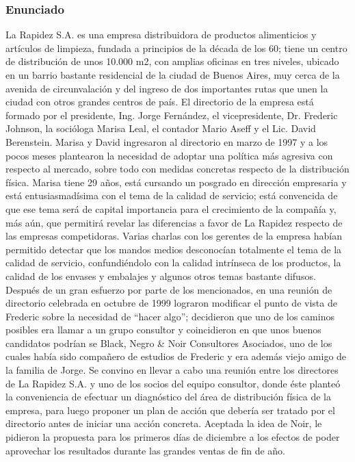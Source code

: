 \documentclass[a4paper,10pt]{article}
\begin{document}
	\subsubsection{Enunciado}
	La Rapidez S.A. es una empresa distribuidora de productos alimenticios y artículos de limpieza, fundada a principios de la década de los 60; tiene un centro de distribución de unos 10.000 m2, con amplias oficinas en tres niveles, ubicado en un barrio bastante residencial de la ciudad de Buenos Aires, muy cerca de la avenida de circunvalación y del ingreso de dos importantes rutas que unen la ciudad con otros grandes centros de país. El directorio de la empresa está formado por el presidente, Ing. Jorge Fernández, el vicepresidente, Dr. Frederic Johnson, la socióloga Marisa Leal, el contador Mario Aseff y el Lic. David Berenstein. Marisa y David ingresaron al directorio en marzo de 1997 y a los pocos meses plantearon la necesidad de adoptar una política más agresiva con respecto al mercado, sobre todo con medidas concretas respecto de la distribución física. Marisa tiene 29 años, está cursando un posgrado en dirección empresaria y está entusiasmadísima con el  tema de la calidad de servicio; está convencida de que ese tema será de capital importancia para el crecimiento de la compañía y, más aún, que permitirá revelar las diferencias a favor de La Rapidez respecto de las empresas competidoras. Varias charlas con los gerentes de la empresa habían permitido detectar que los mandos medios desconocían totalmente el tema de la calidad de servicio, confundiéndolo con la calidad intrínseca de los productos, la calidad de los envases y embalajes y algunos otros temas bastante difusos.\\Después de un gran esfuerzo por parte de los mencionados, en una reunión de directorio celebrada en octubre de 1999 lograron modificar el punto de vista de Frederic sobre la necesidad de “hacer algo”; decidieron que uno de los caminos posibles era llamar a un grupo consultor y coincidieron en que unos buenos candidatos podrían se Black, Negro \& Noir Consultores Asociados, uno de los cuales había sido compañero de estudios de Frederic y era además viejo amigo de la familia de Jorge. Se convino en llevar a cabo una reunión entre los directores de La Rapidez S.A. y uno de los socios del equipo consultor, donde éste planteó la conveniencia de efectuar un diagnóstico del área de distribución física de la empresa, para luego proponer un plan de acción que debería ser tratado por el directorio antes de iniciar una acción concreta. Aceptada la idea de Noir, le pidieron la propuesta para los primeros días de diciembre a los efectos de poder aprovechar los resultados durante las grandes ventas de fin de año.\\
\end{document}
